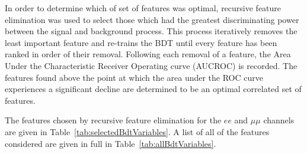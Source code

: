 In order to determine which of set of features was optimal, recursive feature elimination was used to select those which had the greatest discriminating power between the signal and background process.
This process iteratively removes the least important feature and re-trains the BDT until every feature has been ranked in order of their removal.
Following each removal of a feature, the Area Under the Characteristic Receiver Operating curve (AUCROC)  is recorded.
The features found above the point at which the area under the ROC curve experiences a significant decline are determined to be an optimal correlated set of features.
 
The features chosen by recursive feature elimination for the $ee$ and $\mu\mu$ channels are given in Table~\ref{tab:selectedBdtVariables}.
A list of all of the features considered are given in full in Table~\ref{tab:allBdtVariables}.

